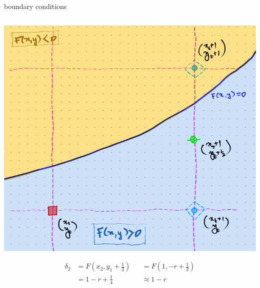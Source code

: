 \documentclass[aspectratio=169,xcolor={dvipsnames,svgnames}]{beamer}
\begin{document}
\begin{frame}[label={sec:orge547dc5}]{boundary conditions}
\begin{columns}
\begin{column}{.35\columnwidth}
\begin{center}
\includegraphics[width=.9\linewidth]{org-download-images/mid-point_algorithm/2024-09-03_22-08-34_screenshot.png}
\end{center}
\begin{align*}
  \delta_2 &= F(x_{2},y_{1}+\frac12) &&= F(1,-r+\frac12) \\
           &= 1-r+\frac14 &&\approx 1-r
\end{align*}
\end{column}
\end{columns}
\end{frame}


\end{document}
